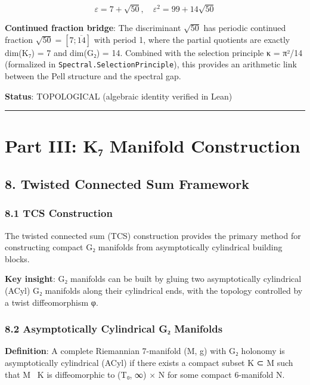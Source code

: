 \documentclass[11pt,a4paper]{article}
\begin{document}
{{{{{{{{{{{{{{{\[\varepsilon = 7 + \sqrt{50}, \quad \varepsilon^2 = 99 + 14\sqrt{50}\]

\textbf{Continued fraction bridge}: The discriminant \(\sqrt{50}\) has periodic continued fraction \(\sqrt{50} = [7; \overline{14}]\) with period 1, where the partial quotients are exactly dim(K₇) = 7 and dim(G₂) = 14. Combined with the selection principle κ = π²/14 (formalized in \texttt{Spectral.SelectionPrinciple}), this provides an arithmetic link between the Pell structure and the spectral gap.

\textbf{Status}: TOPOLOGICAL (algebraic identity verified in Lean)

\begin{center}\rule{0.5\linewidth}{0.5pt}\end{center}

\section{Part III: K₇ Manifold Construction}\label{part-iii-kux2087-manifold-construction}

\subsection{8. Twisted Connected Sum Framework}\label{twisted-connected-sum-framework}

\subsubsection{8.1 TCS Construction}\label{tcs-construction}

The twisted connected sum (TCS) construction provides the primary method for constructing compact G₂ manifolds from asymptotically cylindrical building blocks.

\textbf{Key insight}: G₂ manifolds can be built by gluing two asymptotically cylindrical (ACyl) G₂ manifolds along their cylindrical ends, with the topology controlled by a twist diffeomorphism φ.

\subsubsection{8.2 Asymptotically Cylindrical G₂ Manifolds}\label{asymptotically-cylindrical-gux2082-manifolds}

\textbf{Definition}: A complete Riemannian 7-manifold (M, g) with G₂ holonomy is asymptotically cylindrical (ACyl) if there exists a compact subset K ⊂ M such that M ~K is diffeomorphic to (T₀, ∞) × N for some compact 6-manifold N.

}}}}}}}}}}}}}}}
\end{document}
